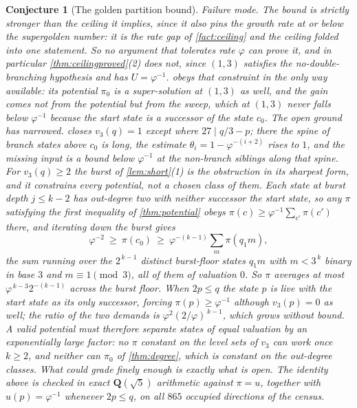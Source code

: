 \documentclass[11pt]{amsart}
\newtheorem{conjecture}[theorem]{Conjecture}
\theoremstyle{definition}
\theoremstyle{remark}
\begin{document}
\begin{conjecture}[The golden partition bound]
\noindent\emph{Failure mode.} The bound is strictly stronger than the ceiling it implies, since it also pins the growth rate at or below the supergolden number: it is the rate gap of \cref{fact:ceiling} and the ceiling folded into one statement. So no argument that tolerates rate $\varphi$ can prove it, and in particular \cref{thm:ceilingproved}(2) does not, since $(1,3)$ satisfies the no-double-branching hypothesis and has $U=\varphi^{-1}$.  obeys that constraint in the only way available: its potential $\pi_0$ is a super-solution at $(1,3)$ as well, and the gain comes not from the potential but from the sweep, which at $(1,3)$ never falls below $\varphi^{-1}$ because the start state is a successor of the state $c_0$. The open ground has narrowed.  closes $v_3(q)=1$ except where $27\mid q/3-p$; there the spine of branch states above $c_0$ is long, the estimate $\theta_i=1-\varphi^{-(i+2)}$ rises to $1$, and the missing input is a bound below $\varphi^{-1}$ at the non-branch siblings along that spine. For $v_3(q)\ge 2$ the burst of \cref{lem:short}(1) is the obstruction in its sharpest form, and it constrains every potential, not a chosen class of them. Each state at burst depth $j\le k-2$ has out-degree two with neither successor the start state, so any $\pi$ satisfying the first inequality of \cref{thm:potential} obeys $\pi(c)\ge\varphi^{-1}\sum_{c'}\pi(c')$ there, and iterating down the burst gives
\[
\varphi^{-2}\ \ge\ \pi(c_0)\ \ge\ \varphi^{-(k-1)}\sum_{m}\pi(q_1m),
\]
the sum running over the $2^{\,k-1}$ distinct burst-floor states $q_1m$ with $m<3^{\,k}$ binary in base $3$ and $m\equiv 1\pmod 3$, all of them of valuation $0$. So $\pi$ averages at most $\varphi^{\,k-3}2^{-(k-1)}$ across the burst floor. When $2p\le q$ the state $p$ is live with the start state as its only successor, forcing $\pi(p)\ge\varphi^{-1}$ although $v_3(p)=0$ as well; the ratio of the two demands is $\varphi^{2}(2/\varphi)^{\,k-1}$, which grows without bound. A valid potential must therefore separate states of equal valuation by an exponentially large factor: no $\pi$ constant on the level sets of $v_3$ can work once $k\ge 2$, and neither can $\pi_0$ of \cref{thm:degree}, which is constant on the out-degree classes. What could grade finely enough is exactly what is open. The identity above is checked in exact $\mathbf{Q}(\sqrt5)$ arithmetic against $\pi=u$, together with $u(p)=\varphi^{-1}$ whenever $2p\le q$, on all $865$ occupied directions of the census.
\end{conjecture}
\end{document}
